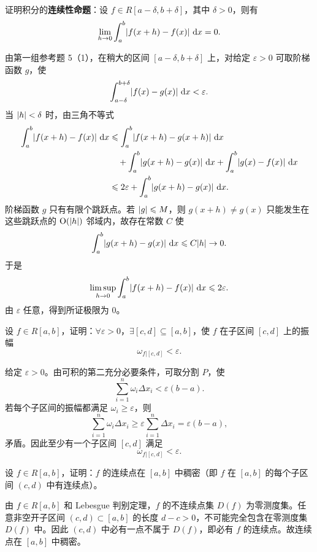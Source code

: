 \begin{xreferenceproblem}[6]
证明积分的\textbf{连续性命题}：设 $f\in R[a-\delta,b+\delta]$，其中 $\delta>0$，则有
\[
  \lim_{h\to0}\int_a^b\lvert f(x+h)-f(x)\rvert\,\mathop{}\!\mathrm{d} x=0.
\]
\end{xreferenceproblem}
\begin{xsolution}
由第一组参考题 5（1），在稍大的区间 $[a-\delta,b+\delta]$ 上，对给定 $\varepsilon>0$ 可取阶梯函数 $g$，使
\[
  \int_{a-\delta}^{b+\delta}\lvert f(x)-g(x)\rvert\,\mathop{}\!\mathrm{d} x<\varepsilon.
\]
当 $\lvert h\rvert<\delta$ 时，由三角不等式
\begin{align*}
  \int_a^b\lvert f(x+h)-f(x)\rvert\,\mathop{}\!\mathrm{d} x
  &\leqslant
  \int_a^b\lvert f(x+h)-g(x+h)\rvert\,\mathop{}\!\mathrm{d} x\\
  &\quad+
  \int_a^b\lvert g(x+h)-g(x)\rvert\,\mathop{}\!\mathrm{d} x
  +\int_a^b\lvert g(x)-f(x)\rvert\,\mathop{}\!\mathrm{d} x\\
  &\leqslant2\varepsilon+
  \int_a^b\lvert g(x+h)-g(x)\rvert\,\mathop{}\!\mathrm{d} x.
\end{align*}
阶梯函数 $g$ 只有有限个跳跃点。若 $\lvert g\rvert\leqslant M$，则 $g(x+h)\ne g(x)$ 只能发生在这些跳跃点的 $\mathrm{O}(\lvert h\rvert)$ 邻域内，故存在常数 $C$ 使
\[
  \int_a^b\lvert g(x+h)-g(x)\rvert\,\mathop{}\!\mathrm{d} x\leqslant C\lvert h\rvert\to0.
\]
于是
\[
  \limsup_{h\to0}\int_a^b\lvert f(x+h)-f(x)\rvert\,\mathop{}\!\mathrm{d} x
  \leqslant2\varepsilon.
\]
由 $\varepsilon$ 任意，得到所证极限为 $0$。
\end{xsolution}


\begin{xreferenceproblem}[7]
设 $f\in R[a,b]$，证明：$\forall\varepsilon>0$，$\exists[c,d]\subseteq[a,b]$，使 $f$ 在子区间 $[c,d]$ 上的振幅
\[
  \omega_{f|[c,d]}<\varepsilon.
\]
\end{xreferenceproblem}
\begin{xsolution}
给定 $\varepsilon>0$。由可积的第二充分必要条件，可取分割 $P$，使
\[
  \sum_{i=1}^n\omega_i\Delta x_i<\varepsilon(b-a).
\]
若每个子区间的振幅都满足 $\omega_i\geqslant\varepsilon$，则
\[
  \sum_{i=1}^n\omega_i\Delta x_i
  \geqslant\varepsilon\sum_{i=1}^n\Delta x_i
  =\varepsilon(b-a),
\]
矛盾。因此至少有一个子区间 $[c,d]$ 满足
\[
  \boxed{\omega_{f|[c,d]}<\varepsilon}.
\]
\end{xsolution}


\begin{xreferenceproblem}[8]
设 $f\in R[a,b]$，证明：$f$ 的连续点在 $[a,b]$ 中稠密（即 $f$ 在 $[a,b]$ 的每个子区间 $(c,d)$ 中有连续点）。
\end{xreferenceproblem}
\begin{xsolution}
由 $f\in R[a,b]$ 和 Lebesgue 判别定理，$f$ 的不连续点集 $D(f)$ 为零测度集。任意非空开子区间 $(c,d)\subset[a,b]$ 的长度 $d-c>0$，不可能完全包含在零测度集 $D(f)$ 中。因此 $(c,d)$ 中必有一点不属于 $D(f)$，即必有 $f$ 的连续点。故连续点在 $[a,b]$ 中稠密。
\end{xsolution}


